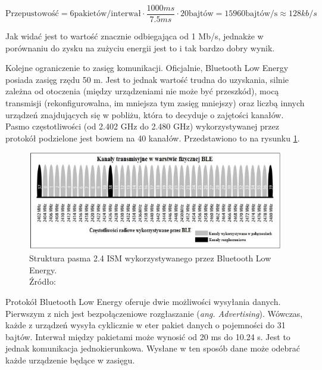 \begin{equation}
	\text{Przepustowość} = 6 \text{pakietów/interwał} \cdot \frac{1000ms}{7.5ms} \cdot 20 \text{bajtów} = 15960 \text{bajtów/s} \approx 128 kb/s
\end{equation}

Jak widać jest to wartość znacznie odbiegająca od 1 Mb/s, jednakże w porównaniu do zysku na zużyciu energii jest to i tak bardzo dobry wynik. 

Kolejne ograniczenie to zasięg komunikacji. Oficjalnie, Bluetooth Low Energy posiada zasięg rzędu 50 m. Jest to jednak wartość trudna do uzyskania, silnie zależna od otoczenia (między urządzeniami nie może być przeszkód), mocą transmisji (rekonfigurowalna, im mniejsza tym zasięg mniejszy) oraz liczbą innych urządzeń znajdujących się w pobliżu, która to decyduje o zajętości kanałów. Pasmo częstotliwości (od 2.402 GHz do 2.480 GHz) wykorzystywanej przez protokół podzielone jest bowiem na 40 kanałów. Przedstawiono to na rysunku \ref{fig:image_ble_channels}.

\begin{figure}[H]
	\centering
	\includegraphics[width=17cm]{img/theory/BLE/ble_channels.png}
	\caption{Struktura pasma 2.4 ISM wykorzystywanego przez Bluetooth Low Energy.\\Źródło: \cite{inzynierka}}
	\label{fig:image_ble_channels}
\end{figure}

Protokół Bluetooth Low Energy oferuje dwie możliwości wysyłania danych. Pierwszym z nich jest bezpołączeniowe rozgłaszanie (\textit{ang. Advertising}). Wówczas, każde z urządzeń wysyła cyklicznie  w eter pakiet danych o pojemności do 31 bajtów. Interwał między pakietami może wynosić od 20 ms do 10.24 s. Jest to jednak komunikacja jednokierunkowa. Wysłane w ten sposób dane może odebrać każde urządzenie będące w zasięgu.


